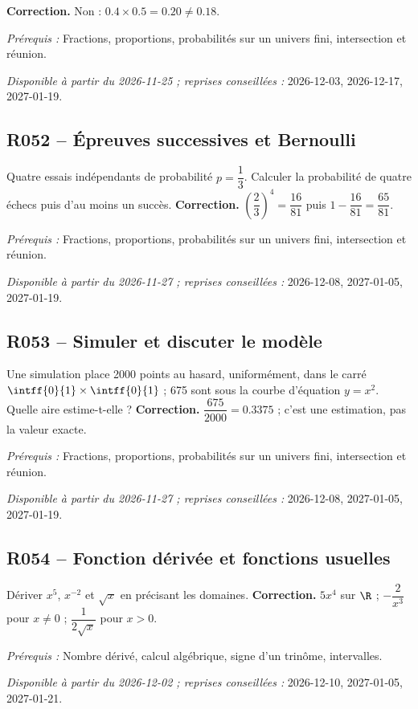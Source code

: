 \ifmxteacher\textbf{Correction.} Non : $\num{0,4}\times\num{0,5}=\num{0,20}\ne\num{0,18}$.\par\textit{Prérequis :} Fractions, proportions, probabilités sur un univers fini, intersection et réunion.\par\textit{Disponible à partir du 2026-11-25 ; reprises conseillées :} 2026-12-03, 2026-12-17, 2027-01-19.\fi
{}\subsection*{R052 -- Épreuves successives et Bernoulli}\label{R052}
Quatre essais indépendants de probabilité $p=\dfrac{1}{3}$. Calculer la probabilité de quatre échecs puis d’au moins un succès.
\ifmxteacher\textbf{Correction.} $(\dfrac{2}{3})^4=\dfrac{16}{81}$ puis $1-\dfrac{16}{81}=\dfrac{65}{81}$.\par\textit{Prérequis :} Fractions, proportions, probabilités sur un univers fini, intersection et réunion.\par\textit{Disponible à partir du 2026-11-27 ; reprises conseillées :} 2026-12-08, 2027-01-05, 2027-01-19.\fi
{}\subsection*{R053 -- Simuler et discuter le modèle}\label{R053}
Une simulation place 2000 points au hasard, uniformément, dans le carré $\intff{0}{1}\times\intff{0}{1}$ ; 675 sont sous la courbe d'équation $y=x^2$. Quelle aire estime-t-elle ?
\ifmxteacher\textbf{Correction.} $\dfrac{675}{2000}=\num{0,3375}$ ; c’est une estimation, pas la valeur exacte.\par\textit{Prérequis :} Fractions, proportions, probabilités sur un univers fini, intersection et réunion.\par\textit{Disponible à partir du 2026-11-27 ; reprises conseillées :} 2026-12-08, 2027-01-05, 2027-01-19.\fi
{}\subsection*{R054 -- Fonction dérivée et fonctions usuelles}\label{R054}
Dériver $x^5$, $x^{-2}$ et $\sqrt x$ en précisant les domaines.
\ifmxteacher\textbf{Correction.} $5x^4$ sur $\R$ ; $-\dfrac{2}{x^3}$ pour $x\ne0$ ; $\dfrac{1}{2\sqrt x}$ pour $x>0$.\par\textit{Prérequis :} Nombre dérivé, calcul algébrique, signe d’un trinôme, intervalles.\par\textit{Disponible à partir du 2026-12-02 ; reprises conseillées :} 2026-12-10, 2027-01-05, 2027-01-21.\fi
